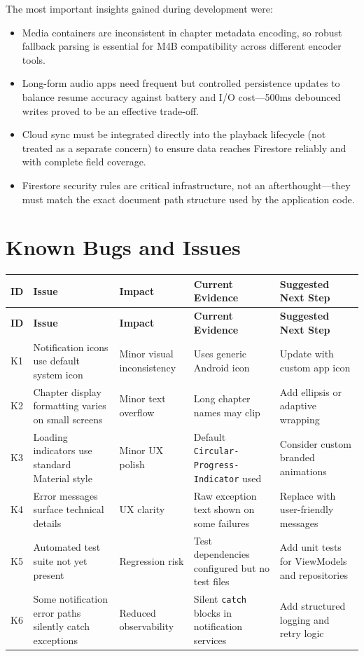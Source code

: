 \documentclass[11pt,a4paper]{article}
\begin{document}
The most important insights gained during development were:
\begin{itemize}[noitemsep]
    \item Media containers are inconsistent in chapter metadata encoding, so robust fallback parsing is essential for M4B compatibility across different encoder tools.
    \item Long-form audio apps need frequent but controlled persistence updates to balance resume accuracy against battery and I/O cost---500ms debounced writes proved to be an effective trade-off.
    \item Cloud sync must be integrated directly into the playback lifecycle (not treated as a separate concern) to ensure data reaches Firestore reliably and with complete field coverage.
    \item Firestore security rules are critical infrastructure, not an afterthought---they must match the exact document path structure used by the application code.
\end{itemize}

\section{Known Bugs and Issues}

{\footnotesize
\begin{longtable}{|p{0.6cm}|>{\RaggedRight}p{4cm}|>{\RaggedRight}p{2.2cm}|>{\RaggedRight}p{2.8cm}|>{\RaggedRight}p{3cm}|}
\hline
\textbf{ID} & \textbf{Issue} & \textbf{Impact} & \textbf{Current Evidence} & \textbf{Suggested Next Step} \\ \hline
\endfirsthead
\hline
\textbf{ID} & \textbf{Issue} & \textbf{Impact} & \textbf{Current Evidence} & \textbf{Suggested Next Step} \\ \hline
\endhead
K1 & Notification icons use default system icon & Minor visual inconsistency & Uses generic Android icon & Update with custom app icon \\ \hline
K2 & Chapter display formatting varies on small screens & Minor text overflow & Long chapter names may clip & Add ellipsis or adaptive wrapping \\ \hline
K3 & Loading indicators use standard Material style & Minor UX polish & Default \texttt{Circular-} \texttt{Progress-} \texttt{Indicator} used & Consider custom branded animations \\ \hline
K4 & Error messages surface technical details & UX clarity & Raw exception text shown on some failures & Replace with user-friendly messages \\ \hline
K5 & Automated test suite not yet present & Regression risk & Test dependencies configured but no test files & Add unit tests for ViewModels and repositories \\ \hline
K6 & Some notification error paths silently catch exceptions & Reduced observability & Silent \texttt{catch} blocks in notification services & Add structured logging and retry logic \\ \hline
\end{longtable}
}
\end{document}
